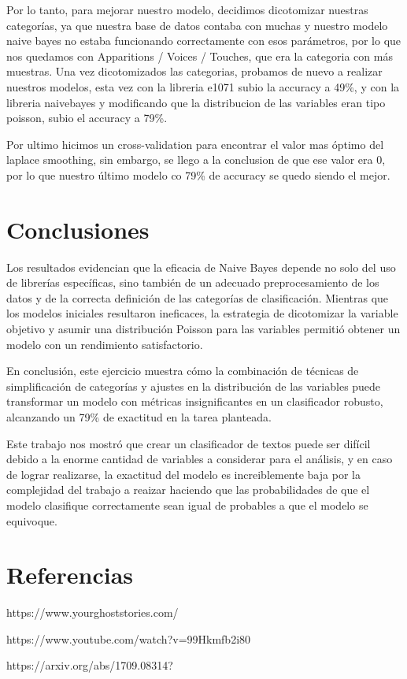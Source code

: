 \documentclass[
  11pt,
  a4paper,
]{article}
\begin{document}
Por lo tanto, para mejorar nuestro modelo, decidimos dicotomizar
nuestras categorías, ya que nuestra base de datos contaba con muchas y
nuestro modelo naive bayes no estaba funcionando correctamente con esos
parámetros, por lo que nos quedamos con Apparitions / Voices / Touches,
que era la categoria con más muestras. Una vez dicotomizados las
categorias, probamos de nuevo a realizar nuestros modelos, esta vez con
la libreria e1071 subio la accuracy a 49\%, y con la libreria naivebayes
y modificando que la distribucion de las variables eran tipo poisson,
subio el accuracy a 79\%.

Por ultimo hicimos un cross-validation para encontrar el valor mas
óptimo del laplace smoothing, sin embargo, se llego a la conclusion de
que ese valor era 0, por lo que nuestro último modelo co 79\% de
accuracy se quedo siendo el mejor.

\section{Conclusiones}\label{conclusiones}

Los resultados evidencian que la eficacia de Naive Bayes depende no solo
del uso de librerías específicas, sino también de un adecuado
preprocesamiento de los datos y de la correcta definición de las
categorías de clasificación. Mientras que los modelos iniciales
resultaron ineficaces, la estrategia de dicotomizar la variable objetivo
y asumir una distribución Poisson para las variables permitió obtener un
modelo con un rendimiento satisfactorio.

En conclusión, este ejercicio muestra cómo la combinación de técnicas de
simplificación de categorías y ajustes en la distribución de las
variables puede transformar un modelo con métricas insignificantes en un
clasificador robusto, alcanzando un 79\% de exactitud en la tarea
planteada.

Este trabajo nos mostró que crear un clasificador de textos puede ser
difícil debido a la enorme cantidad de variables a considerar para el
análisis, y en caso de lograr realizarse, la exactitud del modelo es
increiblemente baja por la complejidad del trabajo a reaizar haciendo
que las probabilidades de que el modelo clasifique correctamente sean
igual de probables a que el modelo se equivoque.

\section{Referencias}\label{referencias}

https://www.yourghoststories.com/

https://www.youtube.com/watch?v=99Hkmfb2i80

https://arxiv.org/abs/1709.08314?
\end{document}
